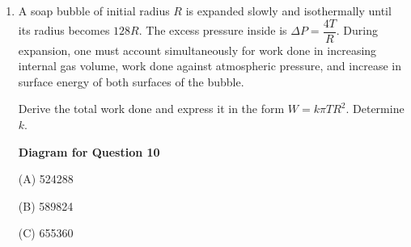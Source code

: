 \documentclass[12pt]{article}
\begin{document}
\begin{enumerate}

(A) $\dfrac{f'}{f}=\dfrac{n-1}{\frac{n}{\mu}-1}$, sign change if $n<\mu$  

(B) $\dfrac{f'}{f}=\dfrac{\frac{n}{\mu}-1}{n-1}$, sign change if $n>\mu$  

(C) $\dfrac{f'}{f}=\dfrac{n-\mu}{n-1}$, sign change if $n<1$  

(D) $\dfrac{f'}{f}=\dfrac{n-1}{n-\mu}$, sign change if $n>\mu$  

\item A soap bubble of initial radius $R$ is expanded slowly and isothermally until its radius becomes $128R$. The excess pressure inside is $\Delta P=\dfrac{4T}{R}$. During expansion, one must account simultaneously for work done in increasing internal gas volume, work done against atmospheric pressure, and increase in surface energy of both surfaces of the bubble.

Derive the total work done and express it in the form $W=k\pi TR^2$. Determine $k$.


\begin{center}
\textbf{Diagram for Question 10}
\end{center}


(A) 524288 

(B) 589824 

(C) 655360  


\end{enumerate}
\end{document}
